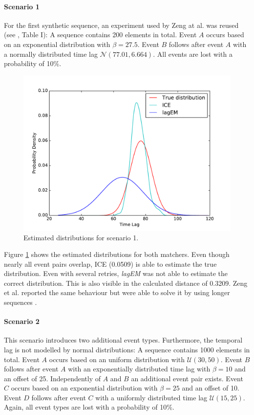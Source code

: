 \documentclass[conference]{IEEEtran}
\theoremstyle{examplestyle}
\begin{document}
\paragraph{Scenario 1}
For the first synthetic sequence, an experiment used by Zeng at al. was reused (see \cite{Zeng2015}, Table I): A sequence contains 200 elements in total. Event \(A\) occurs based on an exponential distribution with \(\beta = 27.5\). Event \(B\) follows after event \(A\) with a normally distributed time lag \(\mathcal{N}(77.01, 6.664)\). All events are lost with a probability of 10\%.


\begin{figure}[!htb]
	\centering
	\includegraphics[scale=0.4]{images/scenarios/1.pdf}
	\caption{Estimated distributions for scenario 1.}
	\label{fig:scen1}
\end{figure}

Figure \ref{fig:scen1} shows the estimated distributions for both matchers. Even though nearly all event pairs overlap, \ac{ICE} (0.0509) is able to estimate the true distribution. Even with several retries, \textit{lagEM} was not able to estimate the correct distribution. This is also visible in the calculated distance of 0.3209. Zeng et al. reported the same behaviour but were able to solve it by using longer sequences \cite{Zeng2015}.



\paragraph{Scenario 2}
This scenario introduces two additional event types. Furthermore, the temporal lag is not modelled by normal distributions: A sequence contains 1000 elements in total. Event \(A\) occurs based on an uniform distribution with \(\mathcal{U}(30, 50)\). Event \(B\) follows after event \(A\) with an exponentially distributed time lag with \(\beta = 10\) and an offset of 25. Independently of \(A\) and \(B\) an additional event pair exists. Event \(C\) occurs based on an exponential distribution with \(\beta = 25\) and an offset of 10. Event \(D\) follows after event \(C\) with a uniformly distributed time lag \(\mathcal{U}(15, 25)\). Again, all event types are lost with a probability of 10\%.
\end{document}
